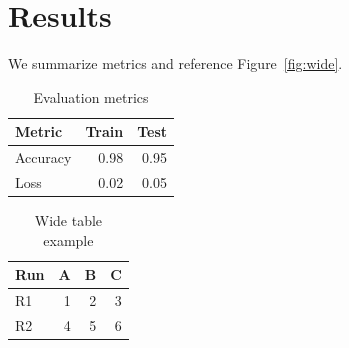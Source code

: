 \section{Results}\label{sec:results}
We summarize metrics and reference Figure~\ref{fig:wide}.

\begin{table}[htbp]
\centering
\begin{tabular}{lrr}
\toprule
Metric & Train & Test \\
\midrule
Accuracy & 0.98 & 0.95 \\
Loss & 0.02 & 0.05 \\
\bottomrule
\end{tabular}
\caption{Evaluation metrics}
\label{tab:metrics}
\end{table}

\begin{table}[htbp]
\centering
\begin{tabular}{lrrr}
\toprule
Run & A & B & C \\
\midrule
R1 & 1 & 2 & 3 \\
R2 & 4 & 5 & 6 \\
\bottomrule
\end{tabular}
\caption{Wide table example}
\label{tab:wide}
\end{table}
